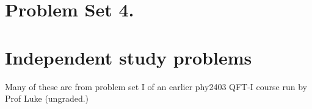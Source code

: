       
      
      
      

   \chapter{Problem Set 4.}

      
      
      
      

   \chapter{Independent study problems}

   Many of these are from problem set I of an earlier phy2403 QFT-I course run by Prof Luke (ungraded.)

      
      
      
      
      
      

      
      
      
